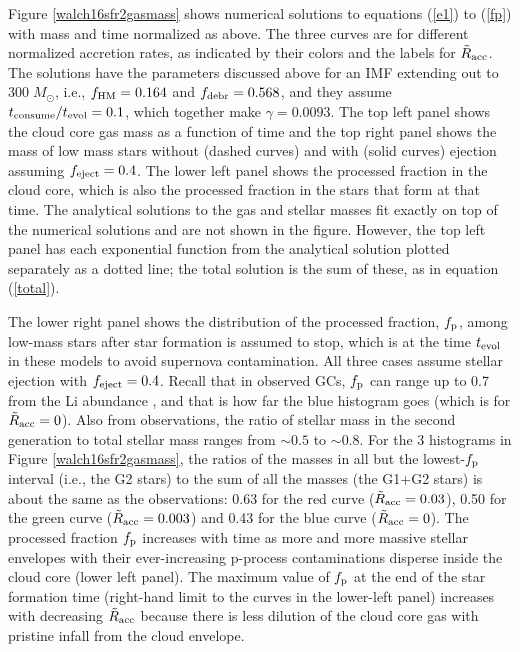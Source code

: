 \documentclass[12pt,preprint]{aastex}
\begin{document}
Figure \ref{walch16sfr2gasmass} shows numerical solutions to equations (\ref{e1})
to (\ref{fp}) with mass and time normalized as above. The three curves are for
different normalized accretion rates, as indicated by their colors and the labels
for ${\tilde R}_{\rm acc}$. The solutions have the parameters discussed above for
an IMF extending out to $300\;M_\odot$, i.e., $f_{\rm HM}=0.164$ and $f_{\rm
debr}=0.568$, and they assume $t_{\rm consume}/t_{\rm evol}=0.1$, which together
make $\gamma=0.0093$. The top left panel shows the cloud core gas mass as a
function of time and the top right panel shows the mass of low mass stars without
(dashed curves) and with (solid curves) ejection assuming $f_{\rm eject}=0.4$.  The
lower left panel shows the processed fraction in the cloud core, which is also the
processed fraction in the stars that form at that time. The analytical solutions to
the gas and stellar masses fit exactly on top of the numerical solutions and are
not shown in the figure. However, the top left panel has each exponential function
from the analytical solution plotted separately as a dotted line; the total
solution is the sum of these, as in equation (\ref{total}).

The lower right panel shows the distribution of the processed fraction, $f_{\rm
p}$, among low-mass stars after star formation is assumed to stop, which is at the
time $t_{\rm evol}$ in these models to avoid supernova contamination. All three
cases assume stellar ejection with $f_{\rm eject}=0.4$. Recall that in observed
GCs, $f_{\rm p}$ can range up to 0.7 from the Li abundance \citep{dec07b}, and that
is how far the blue histogram goes (which is for ${\tilde R}_{\rm acc}=0$). Also
from observations, the ratio of stellar mass in the second generation to total
stellar mass ranges from $\sim0.5$ to $\sim0.8$. For the 3 histograms in Figure
\ref{walch16sfr2gasmass}, the ratios of the masses in all but the lowest-$f_{\rm
p}$ interval (i.e., the G2 stars) to the sum of all the masses (the G1+G2 stars) is
about the same as the observations: 0.63 for the red curve (${\tilde R}_{\rm
acc}=0.03$), 0.50 for the green curve (${\tilde R}_{\rm acc}=0.003$) and 0.43 for
the blue curve (${\tilde R}_{\rm acc}=0$).  The processed fraction $f_{\rm p}$
increases with time as more and more massive stellar envelopes with their
ever-increasing p-process contaminations disperse inside the cloud core (lower left
panel). The maximum value of $f_{\rm p}$ at the end of the star formation time
(right-hand limit to the curves in the lower-left panel) increases with decreasing
${\tilde R}_{\rm acc}$ because there is less dilution of the cloud core gas with
pristine infall from the cloud envelope.
\end{document}
